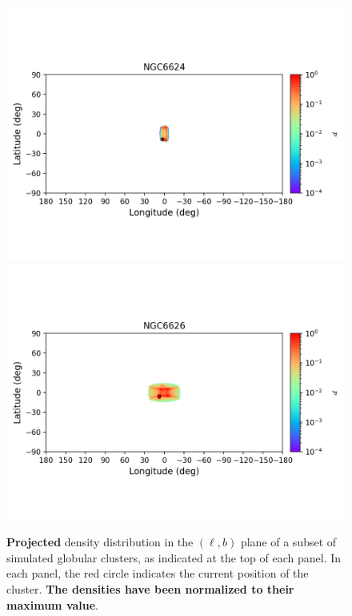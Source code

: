 \begin{figure}
        \includegraphics[clip=true, trim = 0mm 20mm 0mm 10mm, width=1\columnwidth]{images/error_plots_NGC6624.png}
        \includegraphics[clip=true, trim = 0mm 20mm 0mm 10mm, width=1\columnwidth]{images/error_plots_NGC6626.png}
        \caption[]{\textbf{Projected} density distribution in the $(\ell, b)$ plane of a subset of simulated globular clusters, as indicated at the top of each panel. In each panel, the red circle indicates the current position of the cluster. \textbf{The densities have been normalized to their maximum value}.}\label{stream13}
        \end{figure}
